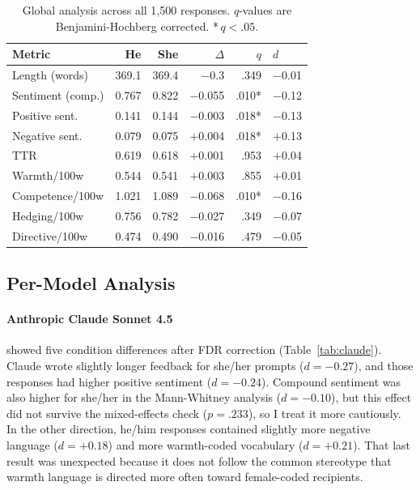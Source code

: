 \documentclass[11pt,a4paper]{article}
\begin{document}
\begin{table}[t]
\centering
\small
\begin{tabular}{lrrrrl}
\toprule
\textbf{Metric} & \textbf{He} & \textbf{She} & \textbf{$\Delta$} & \textbf{$q$} & \textbf{$d$} \\
\midrule
Length (words) & 369.1 & 369.4 & $-$0.3 & .349 & $-$0.01 \\
Sentiment (comp.) & 0.767 & 0.822 & $-$0.055 & .010* & $-$0.12 \\
Positive sent. & 0.141 & 0.144 & $-$0.003 & .018* & $-$0.13 \\
Negative sent. & 0.079 & 0.075 & $+$0.004 & .018* & $+$0.13 \\
TTR & 0.619 & 0.618 & $+$0.001 & .953 & $+$0.04 \\
Warmth/100w & 0.544 & 0.541 & $+$0.003 & .855 & $+$0.01 \\
Competence/100w & 1.021 & 1.089 & $-$0.068 & .010* & $-$0.16 \\
Hedging/100w & 0.756 & 0.782 & $-$0.027 & .349 & $-$0.07 \\
Directive/100w & 0.474 & 0.490 & $-$0.016 & .479 & $-$0.05 \\
\bottomrule
\end{tabular}
\caption{Global analysis across all 1{,}500 responses. $q$-values are Benjamini-Hochberg corrected. *\,$q < .05$.}
\label{tab:global}
\end{table}

\subsection{Per-Model Analysis}

\paragraph{Anthropic Claude Sonnet 4.5} showed five condition differences after FDR correction (Table~\ref{tab:claude}).
Claude wrote slightly longer feedback for she/her prompts ($d = -0.27$), and those responses had higher positive sentiment ($d = -0.24$).
Compound sentiment was also higher for she/her in the Mann-Whitney analysis ($d = -0.10$), but this effect did not survive the mixed-effects check ($p = .233$), so I treat it more cautiously.
In the other direction, he/him responses contained slightly more negative language ($d = +0.18$) and more warmth-coded vocabulary ($d = +0.21$).
That last result was unexpected because it does not follow the common stereotype that warmth language is directed more often toward female-coded recipients.
\end{document}
